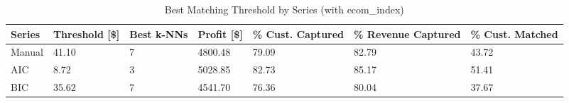 \begin{table}[ht]
\centering
\caption{Best Matching Threshold by Series (with ecom\_index)} 
\label{tab:series_max}
\begin{tabular}{>{\centering\let\newline\\\arraybackslash\hspace{0pt}}m{1.50cm}>{\centering\let\newline\\\arraybackslash\hspace{0pt}}m{2.00cm}>{\centering\let\newline\\\arraybackslash\hspace{0pt}}m{1.50cm}>{\centering\let\newline\\\arraybackslash\hspace{0pt}}m{2.00cm}>{\centering\let\newline\\\arraybackslash\hspace{0pt}}m{2.00cm}>{\centering\let\newline\\\arraybackslash\hspace{0pt}}m{2.00cm}>{\centering\let\newline\\\arraybackslash\hspace{0pt}}m{2.00cm}}
  \hline
Series & Threshold [\$] & Best k-NNs & Profit [\$] & \% Cust. Captured & \% Revenue Captured & \% Cust. Matched \\ 
  \hline
Manual & 41.10 &   7 & 4800.48 & 79.09 & 82.79 & 43.72 \\ 
  AIC & 8.72 &   3 & 5028.85 & 82.73 & 85.17 & 51.41 \\ 
  BIC & 35.62 &   7 & 4541.70 & 76.36 & 80.04 & 37.67 \\ 
   \hline
\end{tabular}
\end{table}

